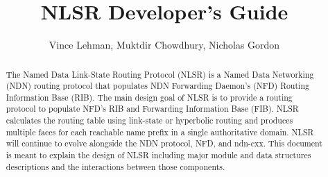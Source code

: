 \documentclass[10pt]{article}
\title{NLSR Developer's Guide}
\author[1]{Vince Lehman, Muktdir Chowdhury, Nicholas Gordon}
\affil[1]{University of Memphis}
\begin{document}
\maketitle

\begin{abstract}
The Named Data Link-State Routing Protocol (NLSR) is a Named Data Networking (NDN) routing protocol that populates NDN Forwarding Daemon's (NFD) Routing Information Base (RIB).
The main design goal of NLSR is to provide a routing protocol to populate NFD's RIB and Forwarding Information Base (FIB).
NLSR calculates the routing table using link-state or hyperbolic routing and produces multiple faces for each reachable name prefix in a single authoritative domain.
NLSR will continue to evolve alongside the NDN protocol, NFD, and ndn-cxx.
This document is meant to explain the design of NLSR including major module and data structures descriptions and the interactions between those components.

\end{abstract}

\tableofcontents
\clearpage


\clearpage

\clearpage

\clearpage

\clearpage

\clearpage

\clearpage

\clearpage

\clearpage
%
%
%

\clearpage

\clearpage

{}



\end{document}
